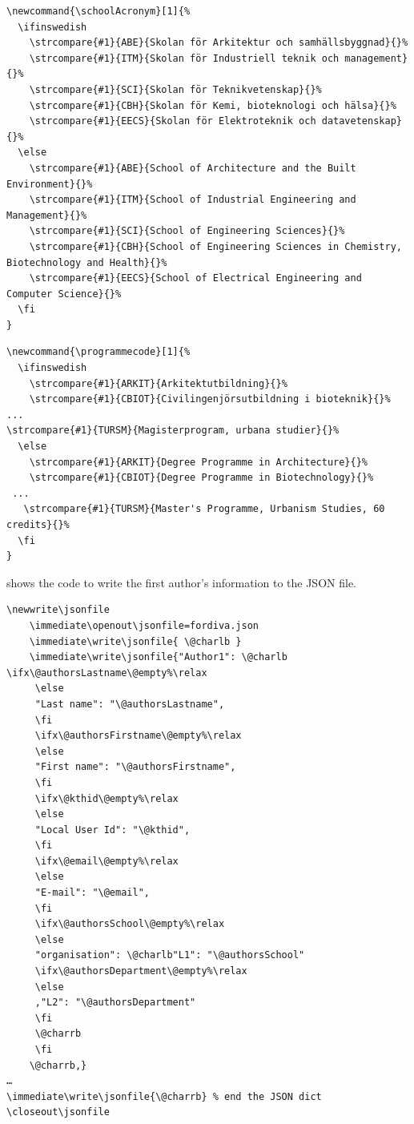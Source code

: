 \begin{lstlisting}[language={[LaTeX]TeX}, caption={New \textbackslash schoolAcronym}, label=lst:newSchoolAcronym] 
% The strcompare is added to kththesis.cls
\newcommand{\schoolAcronym}[1]{%
  \ifinswedish
    \strcompare{#1}{ABE}{Skolan för Arkitektur och samhällsbyggnad}{}%
    \strcompare{#1}{ITM}{Skolan för Industriell teknik och management}{}%
    \strcompare{#1}{SCI}{Skolan för Teknikvetenskap}{}%
    \strcompare{#1}{CBH}{Skolan för Kemi, bioteknologi och hälsa}{}%
    \strcompare{#1}{EECS}{Skolan för Elektroteknik och datavetenskap}{}%
  \else
    \strcompare{#1}{ABE}{School of Architecture and the Built Environment}{}%
    \strcompare{#1}{ITM}{School of Industrial Engineering and Management}{}%
    \strcompare{#1}{SCI}{School of Engineering Sciences}{}%
    \strcompare{#1}{CBH}{School of Engineering Sciences in Chemistry, Biotechnology and Health}{}%
    \strcompare{#1}{EECS}{School of Electrical Engineering and Computer Science}{}%
  \fi
}
\end{lstlisting}
	
\begin{lstlisting}[language={[LaTeX]TeX}, caption={New version of \textbackslash programcode}, label=lst:newProgramcode] 
\newcommand{\programmecode}[1]{%
  \ifinswedish
    \strcompare{#1}{ARKIT}{Arkitektutbildning}{}%
    \strcompare{#1}{CBIOT}{Civilingenjörsutbildning i bioteknik}{}%
...
\strcompare{#1}{TURSM}{Magisterprogram, urbana studier}{}%
  \else
    \strcompare{#1}{ARKIT}{Degree Programme in Architecture}{}%
    \strcompare{#1}{CBIOT}{Degree Programme in Biotechnology}{}%
 ...
   \strcompare{#1}{TURSM}{Master's Programme, Urbanism Studies, 60 credits}{}%
  \fi
}
\end{lstlisting}
 shows the code to write the first author’s information to the JSON file.
\begin{lstlisting}[language={[LaTeX]TeX}, caption={Code to write the first author's information to a "JSON" file}, label=lst:codeToWriteToJSONfile] 
\newwrite\jsonfile
    \immediate\openout\jsonfile=fordiva.json
    \immediate\write\jsonfile{ \@charlb }
    \immediate\write\jsonfile{"Author1": \@charlb \ifx\@authorsLastname\@empty%\relax
     \else
     "Last name": "\@authorsLastname",
     \fi
     \ifx\@authorsFirstname\@empty%\relax
     \else
     "First name": "\@authorsFirstname",
     \fi
     \ifx\@kthid\@empty%\relax
     \else
     "Local User Id": "\@kthid",
     \fi
     \ifx\@email\@empty%\relax
     \else
     "E-mail": "\@email",
     \fi
     \ifx\@authorsSchool\@empty%\relax
     \else
     "organisation": \@charlb"L1": "\@authorsSchool"
     \ifx\@authorsDepartment\@empty%\relax
     \else
     ,"L2": "\@authorsDepartment"
     \fi
     \@charrb
     \fi
    \@charrb,}
…
\immediate\write\jsonfile{\@charrb} % end the JSON dict
\closeout\jsonfile
\end{lstlisting}

